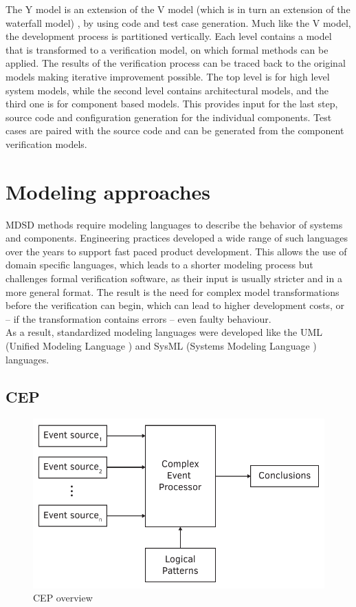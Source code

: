 The Y model \citep{ymodel} is an extension of the V model (which is in turn an extension of the waterfall model) \citep{randomwikipedialink3}, by using code and test case generation. Much like the V model, the development process is partitioned vertically. Each level contains a model that is transformed to a verification model, on which formal methods can be applied. The results of the verification process can be traced back to the original models making iterative improvement possible. The top level is for high level system models, while the second level contains architectural models, and the third one is for component based models. This provides input for the last step, source code and configuration generation for the individual components. Test cases are paired with the source code and can be generated from the component verification models.

\section{Modeling approaches}

MDSD methods require modeling languages to describe the behavior of systems and components. Engineering practices developed a wide range of such languages over the years to support fast paced product development. This allows the use of domain specific languages, which leads to a shorter modeling process but challenges formal verification software, as their input is usually stricter and in a more general format. The result is the need for complex model transformations before the verification can begin, which can lead to higher development costs, or -- if the transformation contains errors -- even faulty behaviour.\\
As a result, standardized modeling languages were developed like the UML (Unified Modeling Language \citep{uml}) and SysML (Systems Modeling Language \citep{sysml}) languages.

\subsection{CEP}

\begin{figure}[h]
	\centering
	\includegraphics[width=0.7\linewidth]{include/figures/chapter_1/CEP}
	\caption{CEP overview}
	\label{fig:intro:vmodel}
\end{figure}

